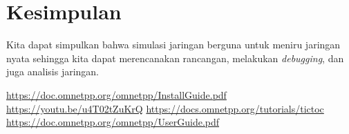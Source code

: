 \documentclass[conference]{IEEEtran}
\begin{document}
\section{Kesimpulan}
Kita dapat simpulkan bahwa simulasi jaringan berguna untuk meniru jaringan nyata sehingga kita dapat merencanakan rancangan, melakukan \textit{debugging}, dan juga analisis jaringan.


\begin{thebibliography}{1}
	\url{https://doc.omnetpp.org/omnetpp/InstallGuide.pdf}
	\url{https://youtu.be/u4T02tZuKrQ}
	\url{https://docs.omnetpp.org/tutorials/tictoc}
	\url{https://doc.omnetpp.org/omnetpp/UserGuide.pdf}
\end{thebibliography}
\end{document}
